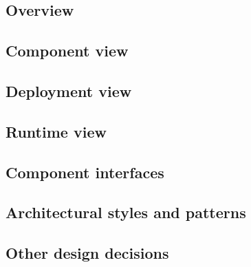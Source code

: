 

\subsection{Overview}
\label{sec:overview}


\subsection{Component view}
\label{sec:component_view}


\subsection{Deployment view}
\label{sec:deployment_view}


\subsection{Runtime view}
\label{sec:runtime_view}


\subsection{Component interfaces}
\label{sec:component_interfaces}


\subsection{Architectural styles and patterns}
\label{sec:styles_patterns}


\subsection{Other design decisions}
\label{sec:other_decisionS}

